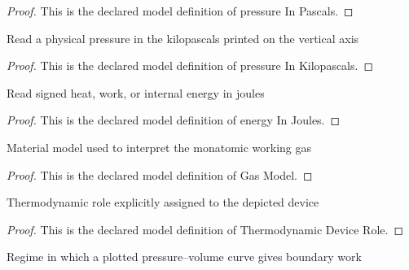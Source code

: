 \begin{proof}
  This is the declared model definition of pressure In Pascals.
\end{proof}
\begin{definition}
  \label{def:physics:phyx-mini-0433:phyxminiproblems-problemphyxmini0433-pressureinkilopascals}
  Read a physical pressure in the kilopascals printed on the vertical axis
\end{definition}
\begin{proof}
  This is the declared model definition of pressure In Kilopascals.
\end{proof}
\begin{definition}
  \label{def:physics:phyx-mini-0433:phyxminiproblems-problemphyxmini0433-energyinjoules}
  Read signed heat, work, or internal energy in joules
\end{definition}
\begin{proof}
  This is the declared model definition of energy In Joules.
\end{proof}
\begin{definition}
  \label{def:physics:phyx-mini-0433:phyxminiproblems-problemphyxmini0433-gasmodel}
  Material model used to interpret the monatomic working gas
\end{definition}
\begin{proof}
  This is the declared model definition of Gas Model.
\end{proof}
\begin{definition}
  \label{def:physics:phyx-mini-0433:phyxminiproblems-problemphyxmini0433-thermodynamicdevicerole}
  Thermodynamic role explicitly assigned to the depicted device
\end{definition}
\begin{proof}
  This is the declared model definition of Thermodynamic Device Role.
\end{proof}
\begin{definition}
  \label{def:physics:phyx-mini-0433:phyxminiproblems-problemphyxmini0433-processregime}
  Regime in which a plotted pressure--volume curve gives boundary work
\end{definition}
